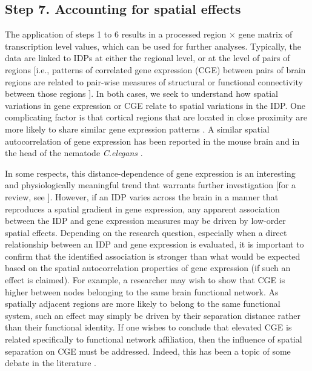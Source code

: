 \subsection{Step 7. Accounting for spatial effects}

The application of steps 1 to 6 results in a processed region $\times$ gene matrix of transcription level values, which can be used for further analyses. Typically, the data are linked to IDPs at either the regional level, or at the level of pairs of regions [i.e., patterns of correlated gene expression (CGE) between pairs of brain regions are related to pair-wise measures of structural or functional connectivity between those regions \citep{Fornito2019}]. In both cases, we seek to understand how spatial variations in gene expression or CGE relate to spatial variations in the IDP. One complicating factor is that cortical regions that are located in close proximity are more likely to share similar gene expression patterns \citep{Richiardi2015,Krienen2016,Vertes2016b,Pantazatos2017,Richiardi2017}. A similar spatial autocorrelation of gene expression has been reported in the mouse brain \citep{Fulcher2016} and in the head of the nematode \textit{C.elegans} \mbox{\citep{Arnatkeviciute2018}}.

In some respects, this distance-dependence of gene expression is an interesting and physiologically meaningful trend that warrants further investigation [for a review, see \citep{Fornito2019}]. However, if an IDP varies across the brain in a manner that reproduces a spatial gradient in gene expression, any apparent association between the IDP and gene expression measures may be driven by low-order spatial effects. Depending on the research question, especially when a direct relationship between an IDP and gene expression is evaluated, it is important to confirm that the identified association is stronger than what would be expected based on the spatial autocorrelation properties of gene expression (if such an effect is claimed). For example, a researcher may wish to show that CGE is higher between nodes belonging to the same brain functional network. As spatially adjacent regions are more likely to belong to the same functional system, such an effect may simply be driven by their separation distance rather than their functional identity. If one wishes to conclude that elevated CGE is related specifically to functional network affiliation, then the influence of spatial separation on CGE must be addressed. Indeed, this has been a topic of some debate in the literature \citep{Richiardi2015,Pantazatos2017,Richiardi2017}.

